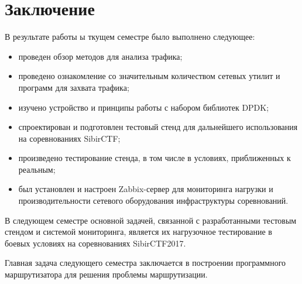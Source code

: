 \section{Заключение}
В результате работы ы ткущем семестре было выполнено следующее:
\begin{itemize}
\item проведен обзор методов для анализа трафика;
\item проведено ознакомление со значительным количеством сетевых утилит и программ для захвата трафика;
\item изучено устройство и принципы работы с набором библиотек DPDK;
\item спроектирован и подготовлен тестовый стенд для дальнейшего использования на соревнованиях SibirCTF;
\item произведено тестирование стенда, в том числе в условиях, приближенных к реальным;
\item был установлен и настроен Zabbix-сервер для мониторинга нагрузки и производительности сетевого оборудования инфраструктуры соревнований.
\end{itemize} 

В следующем семестре основной задачей, связанной с разработанными тестовым стендом и системой мониторинга, является их нагрузочное тестирование в боевых условиях на соревнованиях SibirCTF2017.\par 

Главная задача следующего семестра заключается в построении программного маршрутизатора для решения проблемы маршрутизации.\\
 
